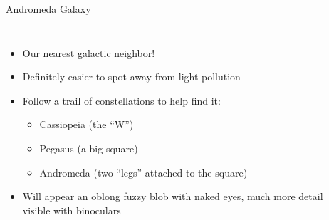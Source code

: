 \documentclass[pdf, ]{beamer}
\begin{document}
\begin{frame}{Andromeda Galaxy}
	\begin{columns}
		\begin{itemize}
			\item Our nearest galactic neighbor!
			\item Definitely easier to spot away from light pollution
			\item Follow a trail of constellations to help find it:
				\begin{itemize}
					\item Cassiopeia (the ``W'')
					\item Pegasus (a big square)
					\item Andromeda (two ``legs'' attached to the square)
				\end{itemize}
			\item Will appear an oblong fuzzy blob with naked eyes, much more detail visible with binoculars
		\end{itemize}
		
		\begin{center}
			\vspace{-5mm}
\end{center}
\end{columns}
\end{frame}
\end{document}
